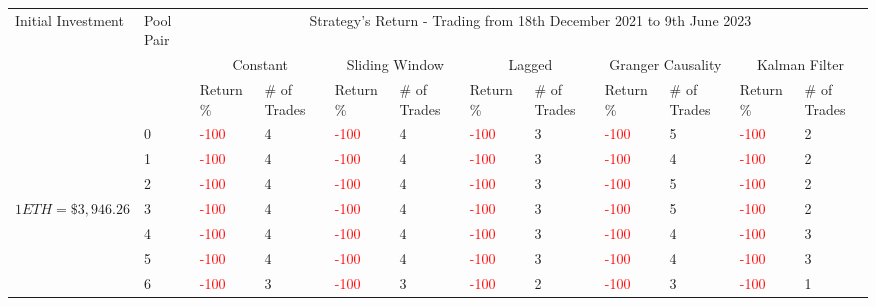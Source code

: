 \begin{table}[htb!]
    \centering
    \begin{adjustwidth}{-0.9in}{-0.9in}
        \begin{tabular}{|p{5em}|p{2em}|p{3em}|p{3em}|p{3em}|p{3em}|p{3em}|p{3em}|p{3em}|p{3em}|p{3em}|p{3em}|}\hline
            Initial Investment & Pool Pair & \multicolumn{10}{|c|}{Strategy's Return - Trading from 18th December 2021 to 9th June 2023} \\\cline{3-12}
            &   & \multicolumn{2}{|c|}{Constant} & \multicolumn{2}{|c|}{Sliding Window} & \multicolumn{2}{|c|}{Lagged} & \multicolumn{2}{|c|}{Granger Causality} & \multicolumn{2}{|c|}{Kalman Filter}\\\cline{3-12}
            & & Return \% & \# of Trades & Return \% & \# of Trades & Return \% & \# of Trades & Return \% & \# of Trades & Return \% & \# of Trades\\\hline

            & 0 & \textcolor{red}{-100} & 4 & \textcolor{red}{-100} & 4 & \textcolor{red}{-100} & 3 & \textcolor{red}{-100} & 5 & \textcolor{red}{-100} & 2\\\cline{3-12}
            & 1 & \textcolor{red}{-100} & 4 & \textcolor{red}{-100} & 4 & \textcolor{red}{-100} & 3 & \textcolor{red}{-100} & 4 & \textcolor{red}{-100} & 2\\\cline{3-12}
            & 2 & \textcolor{red}{-100} & 4 & \textcolor{red}{-100} & 4 & \textcolor{red}{-100} & 3 & \textcolor{red}{-100} & 5 & \textcolor{red}{-100} & 2\\\cline{3-12}
            $1 ETH = \$3,946.26$ & 3 & \textcolor{red}{-100} & 4 & \textcolor{red}{-100} & 4 & \textcolor{red}{-100} & 3 & \textcolor{red}{-100} & 5 & \textcolor{red}{-100} & 2\\[-3ex]\cline{3-12}
            & 4 & \textcolor{red}{-100} & 4 & \textcolor{red}{-100} & 4 & \textcolor{red}{-100} & 3 & \textcolor{red}{-100} & 4 & \textcolor{red}{-100} & 3\\\cline{3-12}
            & 5 & \textcolor{red}{-100} & 4 & \textcolor{red}{-100} & 4 & \textcolor{red}{-100} & 3 & \textcolor{red}{-100} & 4 & \textcolor{red}{-100} & 3\\\cline{3-12}
            & 6 & \textcolor{red}{-100} & 3 & \textcolor{red}{-100} & 3 & \textcolor{red}{-100} & 2 & \textcolor{red}{-100} & 3 & \textcolor{red}{-100} & 1\\\hline\hline


\end{tabular}
\end{adjustwidth}
\end{table}
